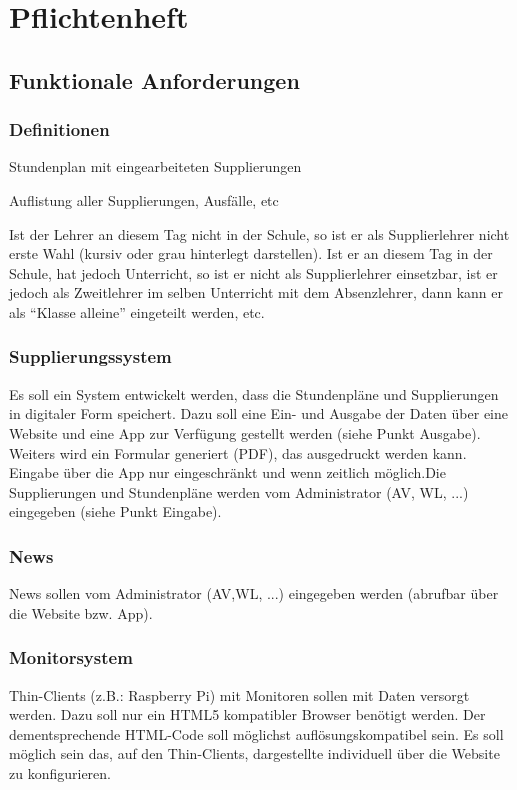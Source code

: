 \chapter{Pflichtenheft}

\section{Funktionale Anforderungen}

\subsection{Definitionen}
\begin{description}[style=nextline]
	\item[angepasster Stundenplan]
		Stundenplan mit eingearbeiteten Supplierungen 
	\item[tabellarischer Supplierplan]
		Auflistung aller Supplierungen, Ausfälle, etc
	\item[Relevanz bei Ersatzlehrern]
		Ist der Lehrer an diesem Tag nicht in der Schule, so ist er als Supplierlehrer nicht erste Wahl (kursiv oder grau hinterlegt darstellen). Ist er an diesem Tag in der Schule, hat jedoch Unterricht, so ist er nicht als Supplierlehrer einsetzbar, ist er jedoch als Zweitlehrer im selben Unterricht mit dem Absenzlehrer, dann kann er als \enquote{Klasse alleine} eingeteilt werden, etc.
\end{description}

\subsection{Supplierungssystem}
Es soll ein System entwickelt werden, dass die Stundenpläne und Supplierungen in digitaler Form speichert. Dazu soll eine Ein- und Ausgabe der Daten über eine Website und eine App zur Verfügung gestellt werden (siehe Punkt Ausgabe). Weiters wird ein Formular generiert (PDF), das ausgedruckt werden kann.\\
Eingabe über die App nur eingeschränkt und wenn zeitlich möglich.Die Supplierungen und Stundenpläne werden vom Administrator (AV, WL, ...) eingegeben (siehe Punkt Eingabe).

\subsection{News}
News sollen vom Administrator (AV,WL, ...) eingegeben werden (abrufbar über die Website bzw. App).

\subsection{Monitorsystem}
Thin-Clients (z.B.: Raspberry Pi) mit Monitoren sollen mit Daten versorgt werden. Dazu soll nur ein HTML5 kompatibler Browser benötigt werden. Der dementsprechende HTML-­Code soll möglichst auflösungskompatibel sein.
Es soll möglich sein das, auf den Thin-Clients, dargestellte individuell über die Website zu konfigurieren.\\

